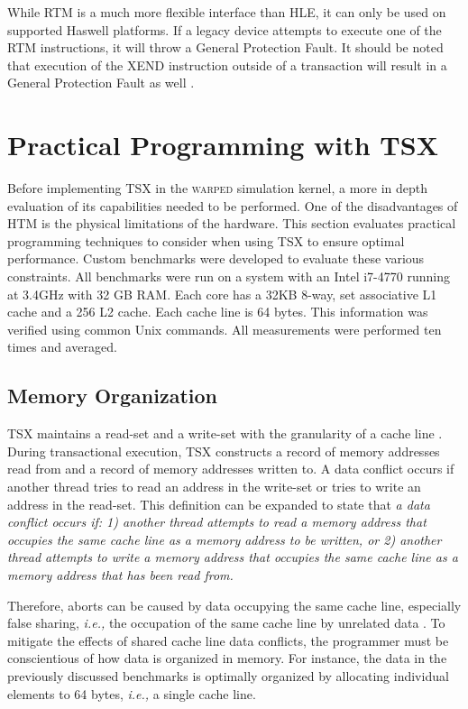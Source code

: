 \documentclass[11pt]{book}
\begin{document}
While RTM is a much more flexible interface than HLE, it can only be used on supported
Haswell platforms.  If a legacy device attempts to execute one of the RTM instructions, it
will throw a General Protection Fault.  It should be noted that execution of the XEND
instruction outside of a transaction will result in a General Protection Fault as well
\cite{intel_opt_man}.


\chapter{Practical Programming with TSX}

Before implementing TSX in the \textsc{warped} simulation kernel, a more in depth
evaluation of its capabilities needed to be performed.  One of the disadvantages
of HTM is the physical limitations of the hardware.  This section evaluates
practical programming techniques to consider when using TSX to ensure optimal
performance.  Custom benchmarks were developed to evaluate these various
constraints.  All benchmarks were run on a system with an Intel i7-4770 running
at 3.4GHz with 32 GB RAM.  Each core has a 32KB 8-way, set associative L1 cache
and a 256 L2 cache.  Each cache line is 64 bytes.  This information was verified
using common Unix commands.  All measurements were performed ten times and
averaged.

\section{Memory Organization}

TSX maintains a read-set and a write-set with the granularity of a cache line
\cite{intel_prog_ref}.  During transactional execution, TSX constructs a record of memory
addresses read from and a record of memory addresses written to.  A data conflict occurs
if another thread tries to read an address in the write-set or tries to write an address
in the read-set.  This definition can be expanded to state that \emph{a data conflict
  occurs if: 1) another thread attempts to read a memory address that occupies the same
  cache line as a memory address to be written, or 2) another thread attempts to write a
  memory address that occupies the same cache line as a memory address that has been read
  from.}

Therefore, aborts can be caused by data occupying the same cache line, especially false
sharing, \emph{i.e.,} the occupation of the same cache line by unrelated data
\cite{intel_opt_man}.  To mitigate the effects of shared cache line data conflicts, the
programmer must be conscientious of how data is organized in memory.  For instance, the
data in the previously discussed benchmarks is optimally organized by allocating
individual elements to 64 bytes, \emph{i.e.,} a single cache line.
\end{document}
